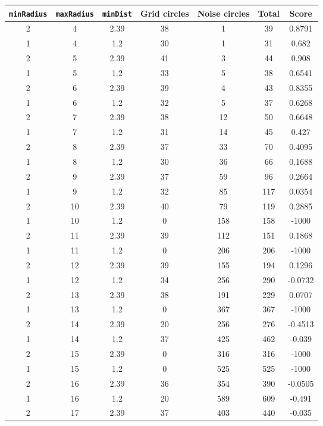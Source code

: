 \documentclass[letterpaper, 12pt]{article}
\begin{document}
\begin{longtable}{|c|c|c|c|c|c|c|}
\hline
\textbf{\texttt{minRadius}} & \textbf{\texttt{maxRadius}} & \textbf{\texttt{minDist}} & \textbf{Grid circles} & \textbf{Noise circles} & \textbf{Total} & \textbf{Score} \\
\hline
2 & 4 & 2.39 & 38 & 1 & 39 & 0.8791 \\
\hline
1 & 4 & 1.2 & 30 & 1 & 31 & 0.682 \\
\hline
2 & 5 & 2.39 & 41 & 3 & 44 & 0.908 \\
\hline
1 & 5 & 1.2 & 33 & 5 & 38 & 0.6541 \\
\hline
2 & 6 & 2.39 & 39 & 4 & 43 & 0.8355 \\
\hline
1 & 6 & 1.2 & 32 & 5 & 37 & 0.6268 \\
\hline
2 & 7 & 2.39 & 38 & 12 & 50 & 0.6648 \\
\hline
1 & 7 & 1.2 & 31 & 14 & 45 & 0.427 \\
\hline
2 & 8 & 2.39 & 37 & 33 & 70 & 0.4095 \\
\hline
1 & 8 & 1.2 & 30 & 36 & 66 & 0.1688 \\
\hline
2 & 9 & 2.39 & 37 & 59 & 96 & 0.2664 \\
\hline
1 & 9 & 1.2 & 32 & 85 & 117 & 0.0354 \\
\hline
2 & 10 & 2.39 & 40 & 79 & 119 & 0.2885 \\
\hline
1 & 10 & 1.2 & 0 & 158 & 158 & -1000 \\
\hline
2 & 11 & 2.39 & 39 & 112 & 151 & 0.1868 \\
\hline
1 & 11 & 1.2 & 0 & 206 & 206 & -1000 \\
\hline
2 & 12 & 2.39 & 39 & 155 & 194 & 0.1296 \\
\hline
1 & 12 & 1.2 & 34 & 256 & 290 & -0.0732 \\
\hline
2 & 13 & 2.39 & 38 & 191 & 229 & 0.0707 \\
\hline
1 & 13 & 1.2 & 0 & 367 & 367 & -1000 \\
\hline
2 & 14 & 2.39 & 20 & 256 & 276 & -0.4513 \\
\hline
1 & 14 & 1.2 & 37 & 425 & 462 & -0.039 \\
\hline
2 & 15 & 2.39 & 0 & 316 & 316 & -1000 \\
\hline
1 & 15 & 1.2 & 0 & 525 & 525 & -1000 \\
\hline
2 & 16 & 2.39 & 36 & 354 & 390 & -0.0505 \\
\hline
1 & 16 & 1.2 & 20 & 589 & 609 & -0.491 \\
\hline
2 & 17 & 2.39 & 37 & 403 & 440 & -0.035 \\

\end{longtable}
\end{document}
